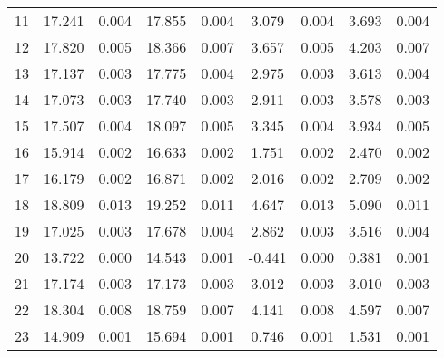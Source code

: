 \documentclass[10pt]{article}
\begin{document}
\begin{longtable}[c]{ccccc|cccc}
11 & \cellcolor{ gray!10 }  17.241 &  0.004 & \cellcolor{ gray!10 }  17.855 &  0.004 & \cellcolor{ gray!10 }  3.079 &  0.004 & \cellcolor{ gray!10 }  3.693 &  0.004 \\
12 & \cellcolor{ gray!10 }  17.820 &  0.005 & \cellcolor{ gray!10 }  18.366 &  0.007 & \cellcolor{ gray!10 }  3.657 &  0.005 & \cellcolor{ gray!10 }  4.203 &  0.007 \\
13 & \cellcolor{ gray!10 }  17.137 &  0.003 & \cellcolor{ gray!10 }  17.775 &  0.004 & \cellcolor{ gray!10 }  2.975 &  0.003 & \cellcolor{ gray!10 }  3.613 &  0.004 \\
14 & \cellcolor{ gray!10 }  17.073 &  0.003 & \cellcolor{ gray!10 }  17.740 &  0.003 & \cellcolor{ gray!10 }  2.911 &  0.003 & \cellcolor{ gray!10 }  3.578 &  0.003 \\
15 & \cellcolor{ gray!10 }  17.507 &  0.004 & \cellcolor{ gray!10 }  18.097 &  0.005 & \cellcolor{ gray!10 }  3.345 &  0.004 & \cellcolor{ gray!10 }  3.934 &  0.005 \\
16 & \cellcolor{ gray!10 }  15.914 &  0.002 & \cellcolor{ gray!10 }  16.633 &  0.002 & \cellcolor{ gray!10 }  1.751 &  0.002 & \cellcolor{ gray!10 }  2.470 &  0.002 \\
17 & \cellcolor{ gray!10 }  16.179 &  0.002 & \cellcolor{ gray!10 }  16.871 &  0.002 & \cellcolor{ gray!10 }  2.016 &  0.002 & \cellcolor{ gray!10 }  2.709 &  0.002 \\
18 & \cellcolor{ gray!10 }  18.809 &  0.013 & \cellcolor{ gray!10 }  19.252 &  0.011 & \cellcolor{ gray!10 }  4.647 &  0.013 & \cellcolor{ gray!10 }  5.090 &  0.011 \\
19 & \cellcolor{ gray!10 }  17.025 &  0.003 & \cellcolor{ gray!10 }  17.678 &  0.004 & \cellcolor{ gray!10 }  2.862 &  0.003 & \cellcolor{ gray!10 }  3.516 &  0.004 \\
20 & \cellcolor{ gray!10 }  13.722 &  0.000 & \cellcolor{ gray!10 }  14.543 &  0.001 & \cellcolor{ gray!10 } -0.441 &  0.000 & \cellcolor{ gray!10 }  0.381 &  0.001 \\
21 & \cellcolor{ gray!10 }  17.174 &  0.003 & \cellcolor{ gray!10 }  17.173 &  0.003 & \cellcolor{ gray!10 }  3.012 &  0.003 & \cellcolor{ gray!10 }  3.010 &  0.003 \\
22 & \cellcolor{ gray!10 }  18.304 &  0.008 & \cellcolor{ gray!10 }  18.759 &  0.007 & \cellcolor{ gray!10 }  4.141 &  0.008 & \cellcolor{ gray!10 }  4.597 &  0.007 \\
23 & \cellcolor{ gray!10 }  14.909 &  0.001 & \cellcolor{ gray!10 }  15.694 &  0.001 & \cellcolor{ gray!10 }  0.746 &  0.001 & \cellcolor{ gray!10 }  1.531 &  0.001 \\

\end{longtable}
\end{document}
